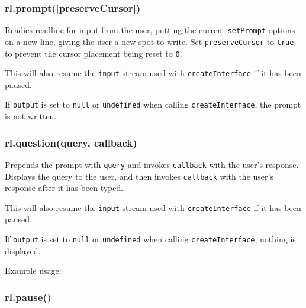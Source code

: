 \subsubsection{rl.prompt({[}preserveCursor{]})}\label{rl.promptpreservecursor}

Readies readline for input from the user, putting the current
\texttt{setPrompt} options on a new line, giving the user a new spot to
write. Set \texttt{preserveCursor} to \texttt{true} to prevent the
cursor placement being reset to \texttt{0}.

This will also resume the \texttt{input} stream used with
\texttt{createInterface} if it has been paused.

If \texttt{output} is set to \texttt{null} or \texttt{undefined} when
calling \texttt{createInterface}, the prompt is not written.

\subsubsection{rl.question(query,
callback)}\label{rl.questionquery-callback}

Prepends the prompt with \texttt{query} and invokes \texttt{callback}
with the user's response. Displays the query to the user, and then
invokes \texttt{callback} with the user's response after it has been
typed.

This will also resume the \texttt{input} stream used with
\texttt{createInterface} if it has been paused.

If \texttt{output} is set to \texttt{null} or \texttt{undefined} when
calling \texttt{createInterface}, nothing is displayed.

Example usage:

\begin{Shaded}
\begin{Highlighting}[]
\NormalTok{(}\NormalTok{, }
  \NormalTok{(} 
\NormalTok{\});}
\end{Highlighting}
\end{Shaded}

\subsubsection{rl.pause()}\label{rl.pause}


